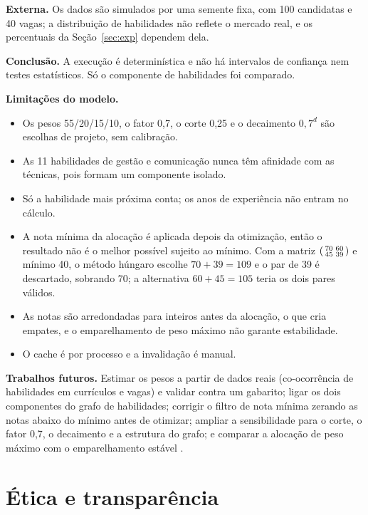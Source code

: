 \documentclass[12pt]{article}
\begin{document}
\textbf{Externa.} Os dados são simulados por uma semente fixa, com 100 candidatas e 40 vagas; a distribuição de habilidades não reflete o mercado real, e os percentuais da Seção~\ref{sec:exp} dependem dela.

\textbf{Conclusão.} A execução é determinística e não há intervalos de confiança nem testes estatísticos. Só o componente de habilidades foi comparado.

\textbf{Limitações do modelo.}
\begin{itemize}
\item Os pesos 55/20/15/10, o fator 0,7, o corte 0,25 e o decaimento $0{,}7^{d}$ são escolhas de projeto, sem calibração.
\item As 11 habilidades de gestão e comunicação nunca têm afinidade com as técnicas, pois formam um componente isolado.
\item Só a habilidade mais próxima conta; os anos de experiência não entram no cálculo.
\item A nota mínima da alocação é aplicada depois da otimização, então o resultado não é o melhor possível sujeito ao mínimo. Com a matriz $\begin{psmallmatrix}70 & 60\\ 45 & 39\end{psmallmatrix}$ e mínimo 40, o método húngaro escolhe $70 + 39 = 109$ e o par de 39 é descartado, sobrando 70; a alternativa $60 + 45 = 105$ teria os dois pares válidos.
\item As notas são arredondadas para inteiros antes da alocação, o que cria empates, e o emparelhamento de peso máximo não garante estabilidade.
\item O cache é por processo e a invalidação é manual.
\end{itemize}

\textbf{Trabalhos futuros.} Estimar os pesos a partir de dados reais (co-ocorrência de habilidades em currículos e vagas) e validar contra um gabarito; ligar os dois componentes do grafo de habilidades; corrigir o filtro de nota mínima zerando as notas abaixo do mínimo antes de otimizar; ampliar a sensibilidade para o corte, o fator 0,7, o decaimento e a estrutura do grafo; e comparar a alocação de peso máximo com o emparelhamento estável \cite{gale1962}.

\section{Ética e transparência}
\label{sec:etica}
\end{document}
